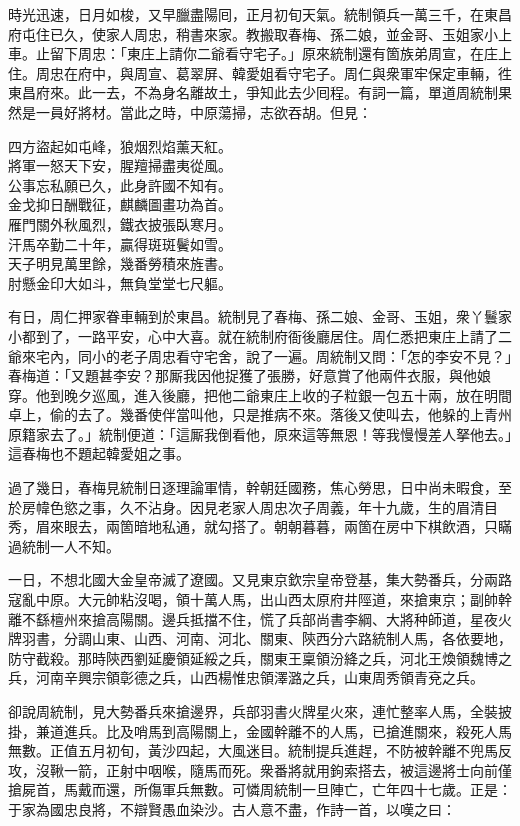 時光迅速，日月如梭，又早臘盡陽囘，正月初旬天氣。統制領兵一萬三千，在東昌府屯住已久，使家人周忠，稍書來家。教搬取春梅、孫二娘，並金哥、玉姐家小上車。止留下周忠：「東庄上請你二爺看守宅子。」原來統制還有箇族弟周宣，在庄上住。周忠在府中，與周宣、葛翠屏、韓愛姐看守宅子。周仁與衆軍牢保定車輛，徃東昌府來。此一去，不為身名離故土，爭知此去少囘程。有詞一篇，單道周統制果然是一員好將材。當此之時，中原蕩掃，志欲吞胡。但見：

\begin{myquote}
四方盜起如屯峰，狼烟烈焰薰天紅。\\將軍一怒天下安，腥羶掃盡夷從風。\\公事忘私願已久，此身許國不知有。{}\\金戈抑日酬戰征，麒麟圖畫功為首。\\雁門關外秋風烈，鐵衣披張臥寒月。\\汗馬卒勤二十年，贏得斑斑鬢如雪。\\天子明見萬里餘，幾番勞積來旌書。\\肘懸金印大如斗，無負堂堂七尺軀。
\end{myquote}

有日，周仁押家眷車輛到於東昌。統制見了春梅、孫二娘、金哥、玉姐，衆丫鬟家小都到了，一路平安，心中大喜。就在統制府衙後廳居住。周仁悉把東庄上請了二爺來宅內，同小的老子周忠看守宅舍，說了一遍。周統制又問：「怎的李安不見？」春梅道：「又題甚李安？那厮我因他捉獲了張勝，好意賞了他兩件衣服，與他娘穿。他到晚夕巡風，進入後廳，把他二爺東庄上收的子粒銀一包五十兩，放在明間卓上，偷的去了。幾番使伴當叫他，只是推病不來。落後又使叫去，他躲的上青州原籍家去了。」統制便道：「這厮我倒看他，原來這等無恩！等我慢慢差人拏他去。」這春梅也不題起韓愛姐之事。

過了幾日，春梅見統制日逐理論軍情，幹朝廷國務，焦心勞思，日中尚未暇食，至於房幃色慾之事，久不沾身。因見老家人周忠次子周義，年十九歲，生的眉清目秀，眉來眼去，兩箇暗地私通，就勾搭了。{}朝朝暮暮，兩箇在房中下棋飲酒，只瞞過統制一人不知。

一日，不想北國大金皇帝滅了遼國。又見東京欽宗皇帝登基，集大勢番兵，分兩路寇亂中原。大元帥粘沒喝，領十萬人馬，出山西太原府井陘道，來搶東京；副帥幹離不繇檀州來搶高陽關。邊兵抵擋不住，慌了兵部尚書李綱、大將种師道，星夜火牌羽書，分調山東、山西、河南、河北、關東、陝西分六路統制人馬，各依要地，防守截殺。那時陝西劉延慶領延綏之兵，關東王稟領汾絳之兵，河北王煥領魏博之兵，河南辛興宗領彰德之兵，山西楊惟忠領澤潞之兵，山東周秀領青兗之兵。

卻說周統制，見大勢番兵來搶邊界，兵部羽書火牌星火來，連忙整率人馬，全裝披掛，兼道進兵。比及哨馬到高陽關上，金國幹離不的人馬，已搶進關來，殺死人馬無數。正值五月初旬，黃沙四起，大風迷目。統制提兵進趕，不防被幹離不兜馬反攻，沒鞦一箭，正射中咽喉，隨馬而死。衆番將就用鉤索搭去，被這邊將士向前僅搶屍首，馬戴而還，所傷軍兵無數。可憐周統制一旦陣亡，亡年四十七歲。正是：于家為國忠良將，不辯賢愚血染沙。古人意不盡，作詩一首，以嘆之曰：

